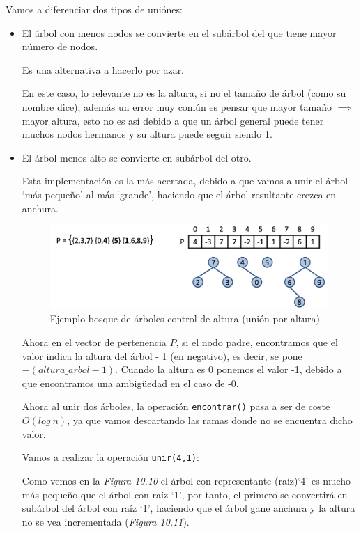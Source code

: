 Vamos a diferenciar dos tipos de uniónes:
\begin{itemize}
  \item {}
  El árbol con menos nodos se convierte en el subárbol del que tiene mayor número de nodos.

  Es una alternativa a hacerlo por azar.

  En este caso, lo relevante no es la altura, si no el tamaño de árbol (como su nombre dice), además un error muy común es pensar que mayor tamaño \(\implies\) mayor altura, esto no es así debido a que un árbol general puede tener muchos nodos hermanos y su altura puede seguir siendo 1.

  \item {}
  El árbol menos alto se convierte en subárbol del otro.

  Esta implementación es la más acertada, debido a que vamos a unir el árbol `más pequeño' al más `grande', haciendo que el árbol resultante crezca en anchura.
  \begin{figure}[h]
    \begin{center}
      \includegraphics[width=\textwidth]{assets/impPAR11.png}
    \end{center}
    \caption{Ejemplo bosque de árboles control de altura (unión por altura)}
  \end{figure}

Ahora en el vector de pertenencia \(P\), si el nodo padre, encontramos que el valor indica la altura del árbol - 1 (en negativo), es decir, se pone \(-(altura\_arbol-1)\). Cuando la altura es 0 ponemos el valor -1, debido a que encontramos una ambigüedad en el caso de -0.

Ahora al unir dos árboles, la operación \texttt{encontrar()} pasa a ser de coste \(O(log\ n)\), ya que vamos descartando las ramas donde no se encuentra dicho valor.

Vamos a realizar la operación \texttt{unir(4,1)}:

Como vemos en la \textit{Figura 10.10} el árbol con representante (raíz)`4' es mucho más pequeño que el árbol con raíz `1', por tanto, el primero se convertirá en subárbol del árbol con raíz `1', haciendo que el árbol gane anchura y la altura no se vea incrementada (\textit{Figura 10.11}).


\end{itemize}
